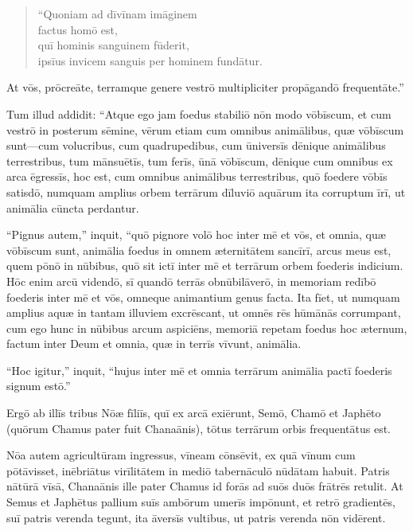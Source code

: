 \begin{verse}
\begin{patverse*}
``Quoniam ad dīvīnam imāginem\\
factus homō est,\\
quī hominis sanguinem fūderit,\\
ipsīus invicem sanguis per hominem fundātur.
\end{patverse*}
\end{verse}
\Versus At vōs, prōcreāte, terramque genere vestrō multipliciter propāgandō frequentāte.''

\Versus Tum illud addidit:
\Versus ``Atque ego jam foedus stabiliō nōn modo vōbīscum, et cum vestrō in posterum sēmine,
\Versus vērum etiam cum omnibus animālibus, quæ vōbīscum sunt—cum volucribus, cum quadrupedibus, cum ūniversīs dēnique animālibus terrestribus, tum mānsuētīs, tum ferīs, ūnā vōbīscum, dēnique cum omnibus ex arca ēgressīs, hoc est, cum omnibus animālibus terrestribus,
\Versus quō foedere vōbīs  satisdō, numquam amplius orbem terrārum dīluviō aquārum ita corruptum īrī, ut animālia cūncta perdantur.

\Versus ``Pignus autem,'' inquit, ``quō pignore volō hoc inter mē et vōs, et omnia, quæ vōbīscum sunt, animālia foedus in omnem æternitātem sancīrī,
\Versus arcus meus est, quem pōnō in nūbibus, quō sit ictī inter mē et terrārum orbem foederis indicium.
\Versus Hōc enim arcū videndō, sī quandō terrās obnūbilāverō,
\Versus in memoriam redībō foederis inter mē et vōs, omneque animantium genus facta.
\Versus Ita fīet, ut numquam amplius aquæ in tantam illuviem excrēscant, ut omnēs rēs hūmānās corrumpant, cum ego hunc in nūbibus arcum aspiciēns, memoriā repetam foedus hoc æternum, factum inter Deum et omnia, quæ in terrīs vīvunt, animālia.

\Versus ``Hoc igitur,'' inquit, ``hujus inter mē et omnia terrārum animālia pactī foederis signum estō.''

\Versus Ergō ab illīs tribus Nōæ fīliīs, quī ex arcā exiērunt, Semō, Chamō et Japhēto (quōrum Chamus pater fuit Chanaānis),
\Versus tōtus terrārum orbis frequentātus est.

\Versus Nōa autem agricultūram ingressus, vīneam cōnsēvit,
\Versus ex quā vīnum cum pōtāvisset, inēbriātus virīlitātem in mediō tabernāculō nūdātam habuit.
\Versus Patris nātūrā vīsā, Chanaānis ille pater Chamus id forās ad suōs duōs frātrēs retulit.
\Versus At Semus et Japhētus pallium suīs ambōrum umerīs impōnunt, et retrō gradientēs, suī patris verenda tegunt, ita āversīs vultibus, ut patris verenda nōn vidērent.

